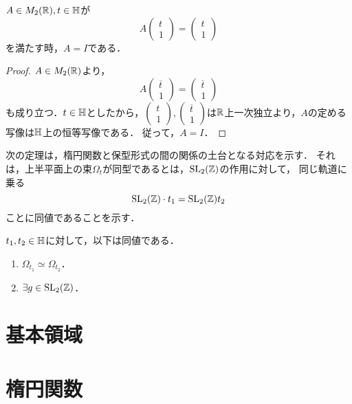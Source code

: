 \documentclass[uplatex, 12pt, dvipdfmx]{jsreport}
\begin{document}
\begin{lemma}
    $A\in M_2(\mathbb{R}),t\in\mathbb{H}$が
    \[ A\begin{pmatrix}t\\1\end{pmatrix}=\begin{pmatrix}t\\1\end{pmatrix} \]
    を満たす時，$A=I$である．
\end{lemma}
\begin{proof}
    $A\in M_2(\mathbb{R})$より，
    \[ A\begin{pmatrix}\overline{t}\\1\end{pmatrix}=\begin{pmatrix}\overline{t}\\1\end{pmatrix} \]
    も成り立つ．$t\in\mathbb{H}$としたから，$\begin{pmatrix}t\\1\end{pmatrix},\begin{pmatrix}\overline{t}\\1\end{pmatrix}$は$\mathbb{R}$上一次独立より，$A$の定める写像は$\mathbb{H}$上の恒等写像である．
    従って，$A=I$．
\end{proof}

次の定理は，楕円関数と保型形式の間の関係の土台となる対応を示す．
それは，上半平面上の束$\Omega_t$が同型であるとは，$\mathrm{SL}_2(\mathbb{Z})$の作用に対して，
同じ軌道に乗る
\[\mathrm{SL}_2(\mathbb{Z})\cdot t_1=\mathrm{SL}_2(\mathbb{Z})t_2\]
ことに同値であることを示す．

\begin{theorem}
    $t_1,t_2\in\mathbb{H}$に対して，以下は同値である．
    \begin{enumerate}
        \item $\Omega_{t_1}\simeq\Omega_{t_2}$．
        \item $\exists g\in\mathrm{SL}_2(\mathbb{Z})$．
    \end{enumerate}
\end{theorem}

\section{基本領域}

\section{楕円関数}
\end{document}
